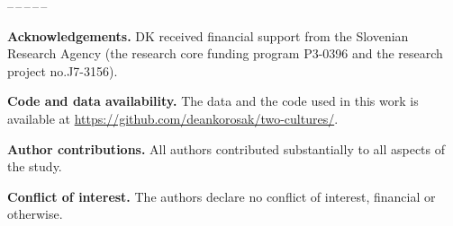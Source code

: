 \documentclass[amsfonts, amssymb, prl, superscriptaddress, notitlepage, twocolumn, nofootinbib]{revtex4-2}
\begin{document}
\begin{center}
--\,--\,--\,--\,--
\end{center}
\vspace{1mm}
\noindent\textbf{Acknowledgements.} DK received financial support from the Slovenian Research Agency (the research core funding program P3-0396 and the research project no.J7-3156). 

\noindent\textbf{Code and data availability.} The data and the code used in this work is available at \url{https://github.com/deankorosak/two-cultures/}.

\noindent\textbf{Author contributions.} All authors contributed substantially to all aspects of the study.

\noindent\textbf{Conflict of interest.} The authors declare no conflict of interest, financial or otherwise.
 

{}

\end{document}
